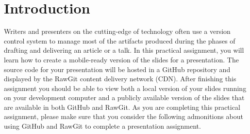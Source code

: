 

\usepackage[compact]{titlesec}



\vspace*{-.2in}
\section*{Introduction}

Writers and presenters on the cutting-edge of technology often use a version control system to manage most of the
artifacts produced during the phases of drafting and delivering an article or a talk. In this practical assignment, you
will learn how to create a mobile-ready version of the slides for a presentation. The source code for your presentation
will be hosted in a GitHub repository and displayed by the RawGit content delivery network (CDN). After finishing this
assignment you should be able to view both a local version of your slides running on your development computer and a
publicly available version of the slides that are available in both GitHub and RawGit. As you are completing this
practical assignment, please make sure that you consider the following admonitions about using GitHub and RawGit to
complete a presentation assignment.

